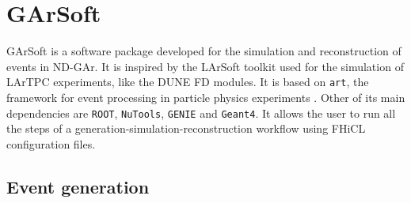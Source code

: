 \section{GArSoft}

GArSoft is a software package developed for the simulation and reconstruction of events in ND-GAr. It is inspired by the LArSoft toolkit used for the simulation of LArTPC experiments, like the DUNE FD modules. It is based on \texttt{art}, the framework for event processing in particle physics experiments \cite{ART}. Other of its main dependencies are \texttt{ROOT}, \texttt{NuTools}, \texttt{GENIE} and \texttt{Geant4}. It allows the user to run all the steps of a generation-simulation-reconstruction workflow using FHiCL configuration files.

\subsection{Event generation}

